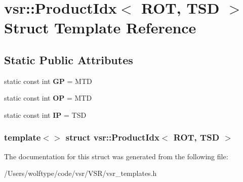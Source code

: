 \hypertarget{structvsr_1_1_product_idx_3_01_r_o_t_00_01_t_s_d_01_4}{\section{vsr\-:\-:Product\-Idx$<$ R\-O\-T, T\-S\-D $>$ Struct Template Reference}
\label{structvsr_1_1_product_idx_3_01_r_o_t_00_01_t_s_d_01_4}
}
\subsection*{Static Public Attributes}
\begin{DoxyCompactItemize}
\item 
\hypertarget{structvsr_1_1_product_idx_3_01_r_o_t_00_01_t_s_d_01_4_ae2e206e0d1e2f5287415c35a32a3acf4}{static const int {\bfseries G\-P} = M\-T\-D}\label{structvsr_1_1_product_idx_3_01_r_o_t_00_01_t_s_d_01_4_ae2e206e0d1e2f5287415c35a32a3acf4}

\item 
\hypertarget{structvsr_1_1_product_idx_3_01_r_o_t_00_01_t_s_d_01_4_ad66087e72a8430920338d5bc81d8a27a}{static const int {\bfseries O\-P} = M\-T\-D}\label{structvsr_1_1_product_idx_3_01_r_o_t_00_01_t_s_d_01_4_ad66087e72a8430920338d5bc81d8a27a}

\item 
\hypertarget{structvsr_1_1_product_idx_3_01_r_o_t_00_01_t_s_d_01_4_ac1bb47ae80f0248ccf46b2e0e897124e}{static const int {\bfseries I\-P} = T\-S\-D}\label{structvsr_1_1_product_idx_3_01_r_o_t_00_01_t_s_d_01_4_ac1bb47ae80f0248ccf46b2e0e897124e}

\end{DoxyCompactItemize}
\subsubsection*{template$<$$>$ struct vsr\-::\-Product\-Idx$<$ R\-O\-T, T\-S\-D $>$}



The documentation for this struct was generated from the following file\-:\begin{DoxyCompactItemize}
\item 
/\-Users/wolftype/code/vsr/\-V\-S\-R/vsr\-\_\-templates.\-h\end{DoxyCompactItemize}
